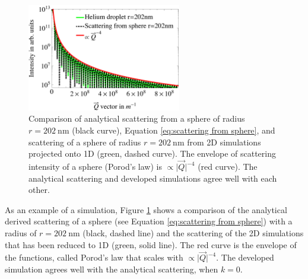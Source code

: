 \begin{figure}
	\centering
		\includegraphics[width=0.60\textwidth]{images/cluster-sphere-intact.png}
	\caption[Comparison of analytical derived scattering and numerical simulations.]{Comparison of analytical scattering from a sphere of radius $r=\SI{202}{\nano\meter}$ (black curve), Equation \eqref{eq:scattering from sphere}, and scattering of a sphere of radius $r=\SI{202}{\nano\meter}$ from 2D simulations projected onto 1D (green, dashed curve). The envelope of scattering intensity of a sphere (Porod's law) is $\propto \lvert \vec{Q}\rvert^{-4}$ (red curve). The analytical scattering and developed simulations agree well with each other.}
	\label{fig:cluster-sphere-intact-2D}
\end{figure}
As an example of a simulation, Figure \ref{fig:cluster-sphere-intact-2D} shows a comparison of the analytical derived scattering of a sphere (see Equation \eqref{eq:scattering from sphere}) with a radius of $r=\SI{202}{\nano\meter}$ (black, dashed line) and the scattering of the 2D simulations that has been reduced to 1D (green, solid line). The red curve is the envelope of the functions, called Porod's law that scales with $\propto \lvert \vec{Q}\rvert^{-4}$. The developed simulation agrees well with the analytical scattering, when $k=0$.
%
%
%
